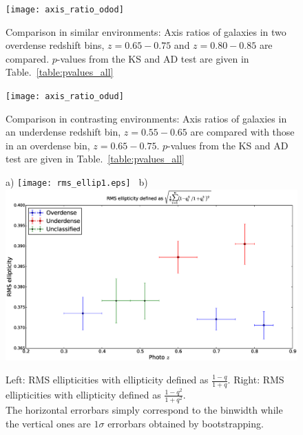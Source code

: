 \documentclass[twocolumn,useAMS,usenatbib]{mn2e}
\begin{document}
\begin{figure}
 \centering
 \texttt{[image: axis\_ratio\_odod]}
 \caption{Comparison in similar environments: Axis ratios of galaxies in two overdense redshift bins, $z=0.65-0.75$ and $z=0.80-0.85$ are compared. $p$-values from the KS and AD test are given in Table.~\ref{table:pvalues_all}}
 \label{fig:axisratio_similar}
\end{figure}

\begin{figure}
 \centering
 \texttt{[image: axis\_ratio\_odud]}
 \caption{Comparison in contrasting environments: Axis ratios of galaxies in an underdense redshift bin, $z=0.55-0.65$ are compared with those in an overdense bin, $z=0.65-0.75$. $p$-values from the KS and AD test are given in Table.~\ref{table:pvalues_all}}
 \label{fig:axisratio_contrasting}
\end{figure}


\begin{figure}
 \centering
 a) \texttt{[image: rms\_ellip1.eps]} \
 b) \includegraphics[width=0.9\columnwidth]{rms_ellip2_noevolution.eps} \\
 \caption{Left: RMS ellipticities with ellipticity defined as $\frac{1-q}{1+q}$. \; 
          Right: RMS ellipticities with ellipticity defined as $\frac{1-q^2}{1+q^2}$.\\ The horizontal errorbars simply correspond to the binwidth while the vertical ones
          are $1\sigma$ errorbars obtained by bootstrapping.}
 \label{fig:rms_ellip}
\end{figure}
\end{document}
